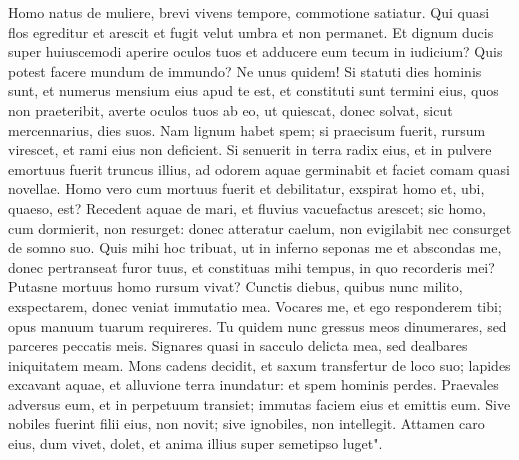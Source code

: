 \begin{biblechapter}  
\verse Homo natus de muliere, brevi vivens tempore, commotione satiatur. 
\verse Qui quasi flos egreditur et arescit et fugit velut umbra et non permanet. 
\verse Et dignum ducis super huiuscemodi aperire oculos tuos et adducere eum tecum in iudicium? 
\verse Quis potest facere mundum de immundo? Ne unus quidem! 
\verse Si statuti dies hominis sunt, et numerus mensium eius apud te est, et constituti sunt termini eius, quos non praeteribit, 
\verse averte oculos tuos ab eo, ut quiescat, donec solvat, sicut mercennarius, dies suos. 
\verse Nam lignum habet spem; si praecisum fuerit, rursum virescet, et rami eius non deficient. 
\verse Si senuerit in terra radix eius, et in pulvere emortuus fuerit truncus illius, 
\verse ad odorem aquae germinabit et faciet comam quasi novellae. 
\verse Homo vero cum mortuus fuerit et debilitatur, exspirat homo et, ubi, quaeso, est? 
\verse Recedent aquae de mari, et fluvius vacuefactus arescet; 
\verse sic homo, cum dormierit, non resurget: donec atteratur caelum, non evigilabit nec consurget de somno suo. 
\verse Quis mihi hoc tribuat, ut in inferno seponas me et abscondas me, donec pertranseat furor tuus, et constituas mihi tempus, in quo recorderis mei? 
\verse Putasne mortuus homo rursum vivat? Cunctis diebus, quibus nunc milito, exspectarem, donec veniat immutatio mea. 
\verse Vocares me, et ego responderem tibi; opus manuum tuarum requireres. 
\verse Tu quidem nunc gressus meos dinumerares, sed parceres peccatis meis. 
\verse Signares quasi in sacculo delicta mea, sed dealbares iniquitatem meam. 
\verse Mons cadens decidit, et saxum transfertur de loco suo; 
\verse lapides excavant aquae, et alluvione terra inundatur: et spem hominis perdes. 
\verse Praevales adversus eum, et in perpetuum transiet; immutas faciem eius et emittis eum. 
\verse Sive nobiles fuerint filii eius, non novit; sive ignobiles, non intellegit. 
\verse Attamen caro eius, dum vivet, dolet, et anima illius super semetipso luget". 
\end{biblechapter}

